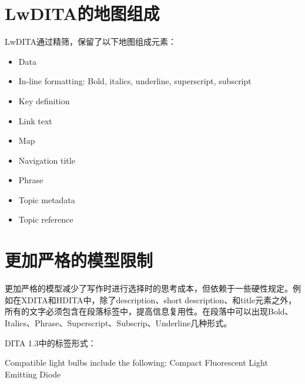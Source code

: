 \documentclass[letterpaper,10pt,english]{sphinxmanual}
\begin{document}
\section{LwDITA的地图组成}
\label{\detokenize{chap3:id2}}
LwDITA通过精筛，保留了以下地图组成元素：
\begin{itemize}
\item {} 
Data

\item {} 
In-line formatting: Bold, italics, underline, superscript, subscript

\item {} 
Key definition

\item {} 
Link text

\item {} 
Map

\item {} 
Navigation title

\item {} 
Phrase

\item {} 
Topic metadata

\item {} 
Topic reference

\end{itemize}


\section{更加严格的模型限制}
\label{\detokenize{chap3:id3}}
更加严格的模型减少了写作时进行选择时的思考成本，但依赖于一些硬性规定。例如在XDITA和HDITA中，除了description、short description、和title元素之外，所有的文字必须包含在段落标签中，提高信息复用性。在段落中可以出现Bold、Italics、Phrase、Superscript、Subscrip、Underline几种形式。

DITA 1.3中的标签形式：

\begin{sphinxVerbatim}[commandchars=\\\{\}]
Compatible light bulbs include the following:
Compact Fluorescent
Light Emitting Diode
\end{sphinxVerbatim}
\end{document}

